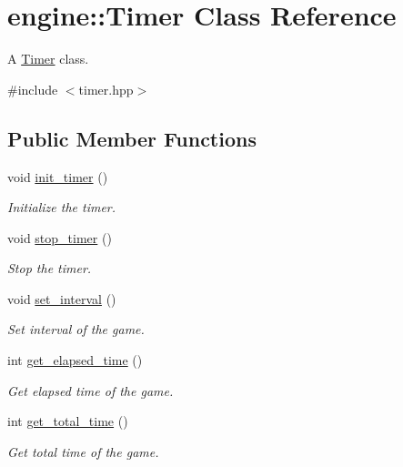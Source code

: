 \hypertarget{classengine_1_1_timer}{}\section{engine\+:\+:Timer Class Reference}
\label{classengine_1_1_timer}


A \hyperlink{classengine_1_1_timer}{Timer} class.  




{\ttfamily \#include $<$timer.\+hpp$>$}

\subsection*{Public Member Functions}
\begin{DoxyCompactItemize}
\item 
void \hyperlink{classengine_1_1_timer_a45123e6a818705f7f960c641a31e1b86}{init\+\_\+timer} ()
\begin{DoxyCompactList}\small\item\em Initialize the timer. \end{DoxyCompactList}\item 
void \hyperlink{classengine_1_1_timer_ac05cde2d44f1a1fc40554bf78a65fe0e}{stop\+\_\+timer} ()
\begin{DoxyCompactList}\small\item\em Stop the timer. \end{DoxyCompactList}\item 
void \hyperlink{classengine_1_1_timer_a230de9674796b8c15ec41a13f772f330}{set\+\_\+interval} ()
\begin{DoxyCompactList}\small\item\em Set interval of the game. \end{DoxyCompactList}\item 
int \hyperlink{classengine_1_1_timer_aeb59bd6b4bb8d26575cb81a9164bd333}{get\+\_\+elapsed\+\_\+time} ()
\begin{DoxyCompactList}\small\item\em Get elapsed time of the game. \end{DoxyCompactList}\item 
int \hyperlink{classengine_1_1_timer_ab5d8002dd5e97d720d5c1d11fcdf315f}{get\+\_\+total\+\_\+time} ()
\begin{DoxyCompactList}\small\item\em Get total time of the game. \end{DoxyCompactList}\end{DoxyCompactItemize}
